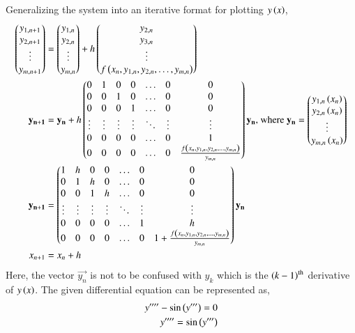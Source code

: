\documentclass[journal]{IEEEtran}
\begin{document}
Generalizing the system into an iterative format for plotting $y\left(x\right)$,
\begin{align}
    \begin{pmatrix}y_{1, n + 1}\\y_{2, n + 1}\\\vdots\\y_{m, n + 1}\end{pmatrix} &= \begin{pmatrix}y_{1, n}\\y_{2, n}\\\vdots\\y_{m, n}\end{pmatrix} + h\begin{pmatrix}y_{2, n}\\y_{3, n}\\\vdots\\f\left(x_n, y_{1, n}, y_{2, n}, \dots, y_{m, n}\right)\end{pmatrix}\\
    \mathbf{y_{n + 1}} &= \mathbf{y_{n}} + h\begin{pmatrix}0 & 1 & 0 & 0 & \dots & 0 & 0\\ 0 & 0 & 1 & 0 & \dots & 0 & 0\\0 & 0 & 0 & 1 & \dots & 0 & 0\\\vdots & \vdots & \vdots & \vdots & \ddots & \vdots & \vdots\\ 0 & 0 & 0 & 0 & \dots & 0 & 1\\0 & 0 & 0 & 0 & \dots & 0 & \frac{f\left(x_n, y_{1, n}, y_{2, n}, \dots, y_{m, n}\right)}{y_{m, n}}\end{pmatrix}\mathbf{y_n} \text{, where } \mathbf{y_n} = \begin{pmatrix}y_{1, n}\left(x_n\right)\\y_{2, n}\left(x_n\right)\\\vdots\\y_{m, n}\left(x_n\right)\end{pmatrix}\\
    \mathbf{y_{n + 1}} &= \begin{pmatrix}1 & h & 0 & 0 & \dots & 0 & 0\\ 0 & 1 & h & 0 & \dots & 0 & 0\\0 & 0 & 1 & h & \dots & 0 & 0\\\vdots & \vdots & \vdots & \vdots& \ddots & \vdots & \vdots\\ 0 & 0 & 0 & 0 & \dots & 1 & h\\0 & 0 & 0 & 0 & \dots & 0 & 1+\frac{f\left(x_n, y_{1, n}, y_{2, n}, \dots, y_{m, n}\right)}{y_{m, n}}\end{pmatrix}\mathbf{y_n}\\
    x_{n + 1} &= x_{n} + h
\end{align}
Here, the vector $\vec{y_n}$ is not to be confused with $y_k$ which is the $\left(k - 1\right)^{\text{th}}$ derivative of $y\left(x\right)$.
\newline
The given differential equation can be represented as,\\
\begin{align}
    y''''-\sin{\ensuremath{\left(y'''\right)}}=0\\
    y''''=\sin{\ensuremath{\left(y'''\right)}}
\end{align}
\end{document}
